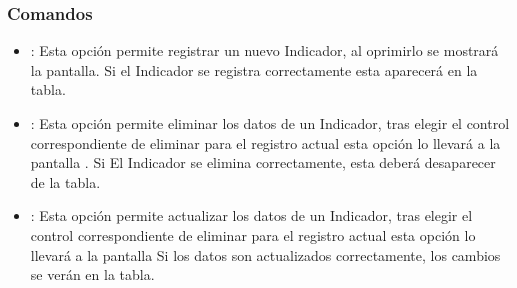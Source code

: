 \subsubsection{Comandos}
\begin{itemize}
 \item {}: Esta opción permite registrar un nuevo Indicador, al oprimirlo se mostrará la pantalla. Si el Indicador se registra correctamente esta aparecerá en la tabla.

 \item {}: Esta opción permite eliminar los datos de un Indicador, tras elegir el control correspondiente de eliminar para el registro actual esta opción lo llevará a la pantalla . Si El Indicador se elimina correctamente, esta deberá desaparecer de la tabla.

 \item {}: Esta opción permite actualizar los datos de un Indicador,  tras elegir el control correspondiente de eliminar para el registro actual esta opción lo llevará a la pantalla Si los datos son actualizados correctamente, los cambios se verán en la tabla.

\end{itemize}